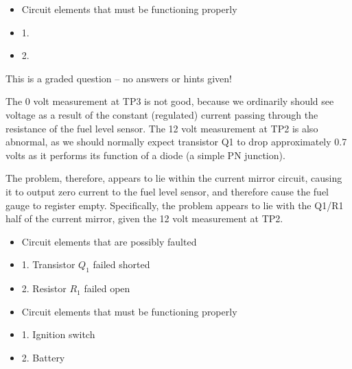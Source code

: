 \begin{itemize}
\goodbreak
\item{} Circuit elements that must be functioning properly
\item{1.} 
\item{2.} 
\end{itemize}

\vfil 

\eject






This is a graded question -- no answers or hints given!







The 0 volt measurement at TP3 is not good, because we ordinarily should see voltage as a result of the constant (regulated) current passing through the resistance of the fuel level sensor.  The 12 volt measurement at TP2 is also abnormal, as we should normally expect transistor Q1 to drop approximately 0.7 volts as it performs its function of a diode (a simple PN junction).  

\vskip 10pt

The problem, therefore, appears to lie within the current mirror circuit, causing it to output zero current to the fuel level sensor, and therefore cause the fuel gauge to register empty.  Specifically, the problem appears to lie with the Q1/R1 half of the current mirror, given the 12 volt measurement at TP2.

\vskip 10pt

\begin{itemize}
\item{} Circuit elements that are possibly faulted
\item{1.} Transistor $Q_1$ failed shorted
\item{2.} Resistor $R_1$ failed open
\end{itemize}

\begin{itemize}
\item{} Circuit elements that must be functioning properly
\item{1.} Ignition switch
\item{2.} Battery
\end{itemize}




